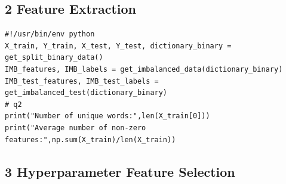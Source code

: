 \documentclass{article}
\begin{document}
\subsection*{2 Feature Extraction}
\begin{lstlisting}
#!/usr/bin/env python
X_train, Y_train, X_test, Y_test, dictionary_binary = get_split_binary_data()
IMB_features, IMB_labels = get_imbalanced_data(dictionary_binary)
IMB_test_features, IMB_test_labels = get_imbalanced_test(dictionary_binary)
# q2
print("Number of unique words:",len(X_train[0]))
print("Average number of non-zero features:",np.sum(X_train)/len(X_train))
\end{lstlisting}

\subsection*{3 Hyperparameter Feature Selection}
\end{document}
